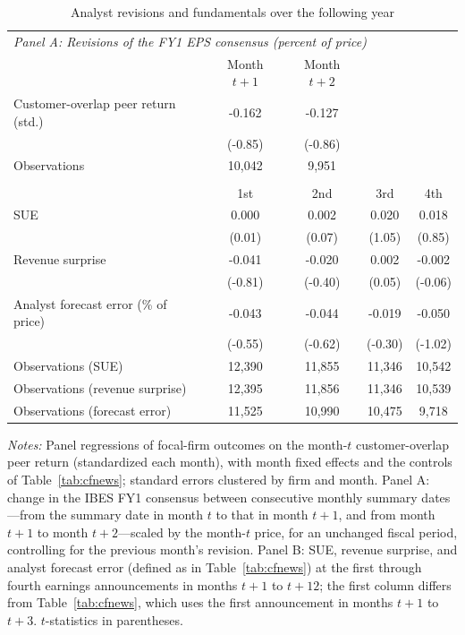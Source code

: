 \begin{table}[!htbp]\centering
\caption{Analyst revisions and fundamentals over the following year}\label{tab:analysts}
\footnotesize
\begin{tabular*}{\linewidth}{@{\extracolsep{\fill}}lcccc}
\toprule
\multicolumn{5}{l}{\emph{Panel A: Revisions of the FY1 EPS consensus (percent of price)}} \\
 & Month $t+1$ & Month $t+2$ &  &  \\
\midrule
Customer-overlap peer return (std.) & -0.162 & -0.127 &  &  \\
 & (-0.85) & (-0.86) &  &  \\
Observations & 10,042 & 9,951 &  &  \\
\addlinespace
\multicolumn{5}{l}{\emph{Panel B: Surprises at the focal firm's next four earnings announcements}} \\
 & 1st & 2nd & 3rd & 4th \\
\midrule
SUE & 0.000 & 0.002 & 0.020 & 0.018 \\
 & (0.01) & (0.07) & (1.05) & (0.85) \\
Revenue surprise & -0.041 & -0.020 & 0.002 & -0.002 \\
 & (-0.81) & (-0.40) & (0.05) & (-0.06) \\
Analyst forecast error (\% of price) & -0.043 & -0.044 & -0.019 & -0.050 \\
 & (-0.55) & (-0.62) & (-0.30) & (-1.02) \\
Observations (SUE) & 12,390 & 11,855 & 11,346 & 10,542 \\
Observations (revenue surprise) & 12,395 & 11,856 & 11,346 & 10,539 \\
Observations (forecast error) & 11,525 & 10,990 & 10,475 & 9,718 \\
\bottomrule
\end{tabular*}
\par\vspace{4pt}\begin{minipage}{\linewidth}\scriptsize \emph{Notes:} Panel regressions of focal-firm outcomes on the month-$t$ customer-overlap peer return (standardized each month), with month fixed effects and the controls of Table~\ref{tab:cfnews}; standard errors clustered by firm and month. Panel A: change in the IBES FY1 consensus between consecutive monthly summary dates---from the summary date in month $t$ to that in month $t+1$, and from month $t+1$ to month $t+2$---scaled by the month-$t$ price, for an unchanged fiscal period, controlling for the previous month's revision. Panel B: SUE, revenue surprise, and analyst forecast error (defined as in Table~\ref{tab:cfnews}) at the first through fourth earnings announcements in months $t+1$ to $t+12$; the first column differs from Table~\ref{tab:cfnews}, which uses the first announcement in months $t+1$ to $t+3$. $t$-statistics in parentheses.\end{minipage}
\end{table}